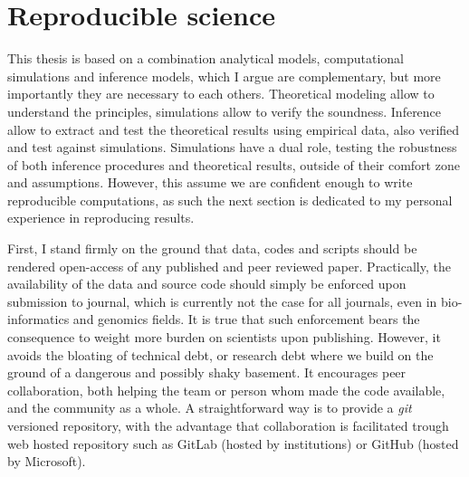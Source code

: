 \section{Reproducible science}
\label{sec:reproducible-science}

This thesis is based on a combination analytical models, computational simulations and inference models, which I argue are complementary, but more importantly they are necessary to each others.
Theoretical modeling allow to understand the principles, simulations allow to verify the soundness.
Inference allow to extract and test the theoretical results using empirical data, also verified and test against simulations.
Simulations have a dual role, testing the robustness of both inference procedures and theoretical results, outside of their comfort zone and assumptions.
However, this assume we are confident enough to write reproducible computations, as such the next section is dedicated to my personal experience in reproducing results.

First, I stand firmly on the ground that data, codes and scripts should be rendered open-access of any published and peer reviewed paper.
Practically, the availability of the data and source code should simply be enforced upon submission to journal, which is currently not the case for all journals, even in bio-informatics and genomics fields.
It is true that such enforcement bears the consequence to weight more burden on scientists upon publishing.
However, it avoids the bloating of technical debt, or research debt where we build on the ground of a dangerous and possibly shaky basement.
It encourages peer collaboration, both helping the team or person whom made the code available, and the community as a whole.
A straightforward way is to provide a \textit{git} versioned repository, with the advantage that collaboration is facilitated trough web hosted repository such as GitLab (hosted by institutions) or GitHub (hosted by Microsoft).

